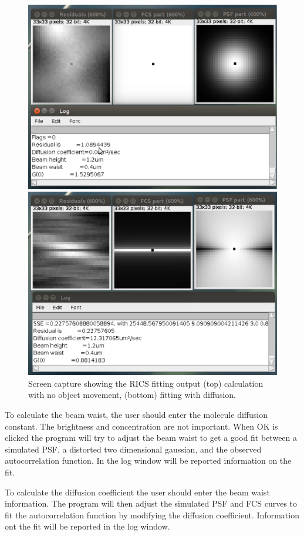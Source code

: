 \documentclass[10pt]{article}
\begin{document}
\begin{figure}
\centerline{\includegraphics[width=.6\textwidth]{Images/FitOutput1.eps}}
\centerline{\includegraphics[width=.6\textwidth]{Images/FitOutput2.eps}}
\caption{Screen capture showing the RICS fitting output (top) calculation with
no object movement, (bottom) fitting with diffusion.}
\label{fig:FitOutput}
\end{figure}

To calculate the beam waist, the user should enter the molecule diffusion constant. 
The brightness and concentration are not important.
When OK is clicked the program will try to adjust the beam waist to get a good 
fit between a simulated PSF, a distorted two dimensional gaussian, and the 
observed autocorrelation function. In the log window will be reported information 
on the fit.

To calculate the diffusion coefficient the user should enter the beam waist 
information. The program will then adjust the simulated PSF and FCS curves to 
fit the autocorrelation function by modifying the diffusion coefficient. Information
ont the fit will be reported in the log window.
\end{document}
